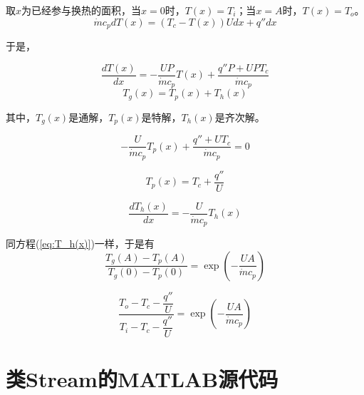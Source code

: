 取$x$为已经参与换热的面积，当$x=0$时，$T(x)=T_i$；当$x=A$时，$T(x)=T_o$。
\begin{equation}
\dot{m}c_{p}dT(x)=(T_{c}-T(x))Udx+q''dx
\end{equation}

于是，

\begin{equation}
\frac{dT(x)}{dx}=-\frac{UP}{\dot{m}c_{p}}T(x)+\frac{q''P+UPT_{c}}{\dot{m}c_{p}}
\end{equation}
\begin{equation}
T_{g}(x)=T_{p}(x)+T_{h}(x)
\end{equation}

其中，$T_{g}(x)$是通解，$T_{p}(x)$是特解，$T_{h}(x)$是齐次解。

\begin{equation}
-\frac{U}{\dot{m}c_{p}}T_{p}(x)+\frac{q''+UT_{c}}{\dot{m}c_{p}}=0
\end{equation}

\begin{equation}
T_{p}(x)=T_{c}+\frac{q''}{U}
\end{equation}

\begin{equation}
\frac{dT_{h}(x)}{dx}=-\frac{U}{\dot{m}c_{p}}T_{h}(x)
\end{equation}

同方程(\ref{eq:T_h(x)})一样，于是有
\begin{equation}
\frac{T_{g}(A)-T_{p}(A)}{T_{g}(0)-T_{p}(0)}=\exp(-\frac{UA}{\dot{m}c_{p}})
\end{equation}

\begin{equation}
\frac{T_{o}-T_{c}-\dfrac{q''}{U}}{T_{i}-T_{c}-\dfrac{q''}{U}}=\exp(-\frac{UA}{\dot{m}c_{p}})
\end{equation}

\chapter{类Stream的MATLAB源代码}
\label{cha:MATLAB_SOURCECODE}


